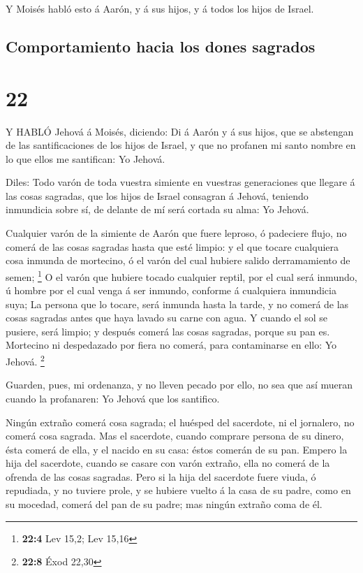  Y Moisés habló esto á Aarón, y á sus hijos, y á todos los
hijos de Israel.

\hypertarget{comportamiento-hacia-los-dones-sagrados}{%
\subsection{Comportamiento hacia los dones
sagrados}\label{comportamiento-hacia-los-dones-sagrados}}

\hypertarget{section-21}{%
\section{22}\label{section-21}}

 Y HABLÓ Jehová á Moisés, diciendo:  Di á Aarón
y á sus hijos, que se abstengan de las santificaciones de los hijos de
Israel, y que no profanen mi santo nombre en lo que ellos me santifican:
Yo Jehová.

 Diles: Todo varón de toda vuestra simiente en vuestras
generaciones que llegare á las cosas sagradas, que los hijos de Israel
consagran á Jehová, teniendo inmundicia sobre sí, de delante de mí será
cortada su alma: Yo Jehová.

 Cualquier varón de la simiente de Aarón que fuere leproso,
ó padeciere flujo, no comerá de las cosas sagradas hasta que esté
limpio: y el que tocare cualquiera cosa inmunda de mortecino, ó el varón
del cual hubiere salido derramamiento de semen; \footnote{\textbf{22:4}
  Lev 15,2; Lev 15,16}  O el varón que hubiere tocado
cualquier reptil, por el cual será inmundo, ú hombre por el cual venga á
ser inmundo, conforme á cualquiera inmundicia suya;  La
persona que lo tocare, será inmunda hasta la tarde, y no comerá de las
cosas sagradas antes que haya lavado su carne con agua.  Y
cuando el sol se pusiere, será limpio; y después comerá las cosas
sagradas, porque su pan es.  Mortecino ni despedazado por
fiera no comerá, para contaminarse en ello: Yo Jehová. \footnote{\textbf{22:8}
  Éxod 22,30}

 Guarden, pues, mi ordenanza, y no lleven pecado por ello,
no sea que así mueran cuando la profanaren: Yo Jehová que los santifico.

 Ningún extraño comerá cosa sagrada; el huésped del
sacerdote, ni el jornalero, no comerá cosa sagrada.  Mas el
sacerdote, cuando comprare persona de su dinero, ésta comerá de ella, y
el nacido en su casa: éstos comerán de su pan.  Empero la
hija del sacerdote, cuando se casare con varón extraño, ella no comerá
de la ofrenda de las cosas sagradas.  Pero si la hija del
sacerdote fuere viuda, ó repudiada, y no tuviere prole, y se hubiere
vuelto á la casa de su padre, como en su mocedad, comerá del pan de su
padre; mas ningún extraño coma de él.

